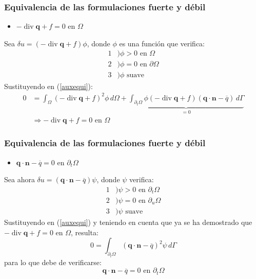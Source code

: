 \documentclass{beamer}
\begin{document}
\begin{frame}
\frametitle{Equivalencia de las formulaciones fuerte y débil}
\begin{itemize}
\item[a)] $-\operatorname{div} \bm{q} +f=0 \textrm{ en } \Omega$
\end{itemize}
Sea $\delta u=(-\operatorname{div} \bm{q} +f) \phi$,
donde $\phi$ es una función que verifica:
\begin{align*}
1&) \phi>0 \textrm{ en } \Omega \\
2&) \phi=0 \textrm{ en } \partial \Omega \\
3&) \phi \textrm{ suave }
\end{align*}
Sustituyendo en (\ref{auxequi}):
\begin{align*}
0&=\int_{\Omega} \left(-\operatorname{div} \bm{q} +f \right)^2 \phi \, d\Omega+
\underbrace{\int_{\partial_t \Omega} \phi \left(-\operatorname{div} \bm{q} +f \right)
\left( \bm{q}\cdot \bm{n} - \overline{q} \right) \,d \Gamma}_{=0} \\
&\Rightarrow
-\operatorname{div} \bm{q} +f=0 \textrm{ en } \Omega
\end{align*}
\end{frame}
\begin{frame}
\frametitle{Equivalencia de las formulaciones fuerte y débil}
\begin{itemize}
\item[b)] $\bm{q}\cdot \bm{n} - \overline{q}=0 \textrm{ en } \partial_t \Omega$
\end{itemize}
Sea ahora $\delta u=(\bm{q}\cdot \bm{n} - \overline{q}) \psi$,
donde $\psi$ verifica:
\begin{align*}
1&) \psi>0 \textrm{ en } \partial_t \Omega \\
2&) \psi=0 \textrm{ en } \partial_u \Omega \\
3&) \psi \textrm{ suave }
\end{align*}
Sustituyendo en (\ref{auxequi}) y teniendo en cuenta que ya se ha demostrado
que $-\operatorname{div} \bm{q} +f=0$ en $\Omega$, resulta:
\begin{equation*}
0=\int_{\partial_t \Omega} \left(\bm{q}\cdot \bm{n} - \overline{q}
\right)^2 \psi \, d \Gamma
\end{equation*}
para lo que debe de verificarse:
\begin{equation*}
\bm{q}\cdot \bm{n} - \overline{q}=0 \textrm{ en } \partial_t \Omega
\end{equation*}
\end{frame}
\end{document}
